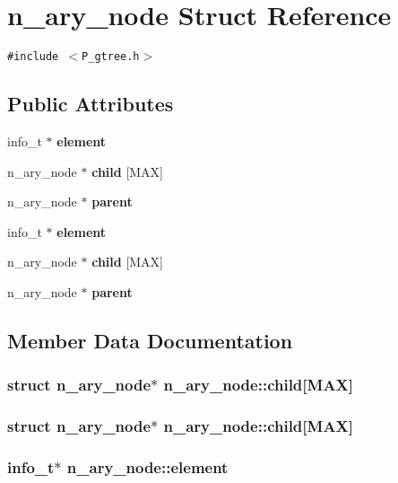 \section{n\_\-ary\_\-node  Struct Reference}
\label{structn__ary__node}
{\tt \#include $<$P\_\-gtree.h$>$}

\subsection*{Public Attributes}
\begin{CompactItemize}
\item 
info\_\-t $\ast$ {\bf element}
\item 
n\_\-ary\_\-node $\ast$ {\bf child} [MAX]
\item 
n\_\-ary\_\-node $\ast$ {\bf parent}
\item 
info\_\-t $\ast$ {\bf element}
\item 
n\_\-ary\_\-node $\ast$ {\bf child} [MAX]
\item 
n\_\-ary\_\-node $\ast$ {\bf parent}
\end{CompactItemize}


\subsection{Member Data Documentation}
\subsubsection{\setlength{\rightskip}{0pt plus 5cm}struct n\_\-ary\_\-node$\ast$ n\_\-ary\_\-node::child[MAX]}\label{structn__ary__node_m4}


\subsubsection{\setlength{\rightskip}{0pt plus 5cm}struct n\_\-ary\_\-node$\ast$ n\_\-ary\_\-node::child[MAX]}\label{structn__ary__node_m1}


\subsubsection{\setlength{\rightskip}{0pt plus 5cm}info\_\-t$\ast$ n\_\-ary\_\-node::element}\label{structn__ary__node_m3}


